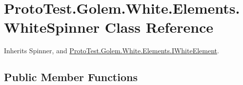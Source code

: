 \hypertarget{class_proto_test_1_1_golem_1_1_white_1_1_elements_1_1_white_spinner}{\section{Proto\-Test.\-Golem.\-White.\-Elements.\-White\-Spinner Class Reference}
\label{class_proto_test_1_1_golem_1_1_white_1_1_elements_1_1_white_spinner}
}


Inherits Spinner, and \hyperlink{interface_proto_test_1_1_golem_1_1_white_1_1_elements_1_1_i_white_element}{Proto\-Test.\-Golem.\-White.\-Elements.\-I\-White\-Element}.

\subsection*{Public Member Functions}
